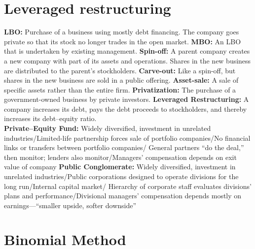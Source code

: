 \documentclass{cheatsheet}
\begin{document}
\section{Leveraged restructuring}
\textbf{LBO:} Purchase of a business using mostly debt financing. The company goes private so that its stock
no longer trades in the open market.
\textbf{MBO:} An LBO that is undertaken by existing management.
\textbf{Spin-off:} A parent company creates a new company with part of its assets and operations. Shares in
the new business are distributed to the parent’s stockholders.
\textbf{Carve-out:} Like a spin-off, but shares in the new business are sold in a public offering.
\textbf{Asset-sale:} A sale of specific assets rather than the entire firm.
\textbf{Privatization:} The purchase of a government-owned business by private investors.
\textbf{Leveraged Restructuring:} A company increases its debt, pays the debt proceeds to stockholders, and
thereby increases its debt–equity ratio.\\
\textbf{Private–Equity Fund:} Widely diversified, investment in unrelated
industries/Limited-life partnership forces sale of portfolio companies/No financial links or transfers between portfolio companies/
General partners “do the deal,” then monitor; lenders also monitor/Managers’ compensation depends on exit value of company
\textbf{Public Conglomerate:} Widely diversified, investment in unrelated industries/Public corporations designed to operate divisions for the long run/Internal capital market/
Hierarchy of corporate staff evaluates divisions’ plans and performance/Divisional managers’ compensation depends mostly on earnings—“smaller upside, softer downside”\\


\section*{Binomial Method}
\end{document}
